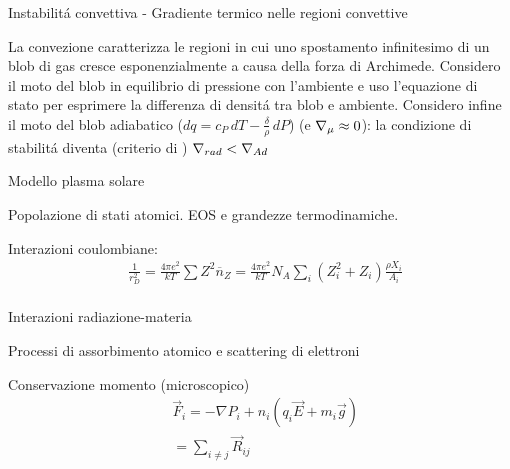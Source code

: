 \documentclass[10pt,xcolor={usenames},fleqn,mathserif,serif]{beamer}
\begin{document}
\begin{wordonframe}{Instabilit\'a convettiva - Gradiente termico nelle regioni convettive}

La convezione caratterizza le regioni in cui uno spostamento infinitesimo di un blob di gas cresce esponenzialmente a causa della forza di Archimede. Considero il moto del blob in equilibrio di pressione con l'ambiente e uso l'equazione di stato per esprimere la differenza di densit\'a tra blob e ambiente. Considero infine il moto del blob adiabatico ($dq=c_P\,dT-\frac{\delta}{\rho}\,dP$) (e $\nabla_{\mu}{}\approx0$): la condizione di stabilit\'a diventa (criterio di \sch{}) $\nabla_{rad}{}<\nabla_{Ad}{}$

\end{wordonframe}



\begin{frame}{Modello plasma solare}

\begin{block}{Popolazione di stati atomici. EOS e grandezze termodinamiche.}

Interazioni coulombiane:
\begin{align*}
&\frac{1}{r_D^2}=\frac{4\pi e^2}{kT}\sum Z^2\overline{n}_Z=\frac{4\pi e^2}{kT}N_A\sum_{i}(Z_i^2+Z_i)\frac{\rho X_i}{A_i}\\
\end{align*}

\end{block}

\begin{block}{Interazioni radiazione-materia}

Processi di assorbimento atomico e scattering di elettroni

\end{block}

\begin{block}{Conservazione momento (microscopico)}
\begin{align*}
&\vec{F}_i=-\nabla P_i+n_i(q_i\vec{E}+m_i\vec{g})\\
&=\sum_{i\neq j}\vec{R}_{ij}
\end{align*}

\end{block}

\end{frame}
\end{document}
